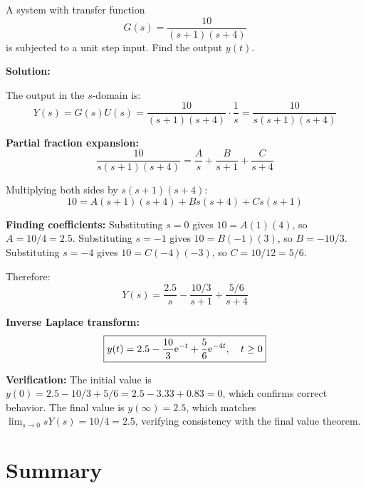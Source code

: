 \begin{example}
\label{ex:inverse_laplace}
A system with transfer function
\begin{equation}
G(s) = \frac{10}{(s+1)(s+4)}
\end{equation}
is subjected to a unit step input. Find the output $y(t)$.

\textbf{Solution:}

The output in the $s$-domain is:
\begin{equation}
Y(s) = G(s)U(s) = \frac{10}{(s+1)(s+4)} \cdot \frac{1}{s} = \frac{10}{s(s+1)(s+4)}
\end{equation}

\textbf{Partial fraction expansion:}
\begin{equation}
\frac{10}{s(s+1)(s+4)} = \frac{A}{s} + \frac{B}{s+1} + \frac{C}{s+4}
\end{equation}

Multiplying both sides by $s(s+1)(s+4)$:
\begin{equation}
10 = A(s+1)(s+4) + Bs(s+4) + Cs(s+1)
\end{equation}

\textbf{Finding coefficients:} Substituting $s = 0$ gives $10 = A(1)(4)$, so $A = 10/4 = 2.5$. Substituting $s = -1$ gives $10 = B(-1)(3)$, so $B = -10/3$. Substituting $s = -4$ gives $10 = C(-4)(-3)$, so $C = 10/12 = 5/6$.

Therefore:
\begin{equation}
Y(s) = \frac{2.5}{s} - \frac{10/3}{s+1} + \frac{5/6}{s+4}
\end{equation}

\textbf{Inverse Laplace transform:}
\begin{equation}
\boxed{y(t) = 2.5 - \frac{10}{3}\mathrm{e}^{-t} + \frac{5}{6}\mathrm{e}^{-4t}, \quad t \geq 0}
\end{equation}

\textbf{Verification:} The initial value is $y(0) = 2.5 - 10/3 + 5/6 = 2.5 - 3.33 + 0.83 = 0$, which confirms correct behavior. The final value is $y(\infty) = 2.5$, which matches $\lim_{s\to 0}sY(s) = 10/4 = 2.5$, verifying consistency with the final value theorem.
\end{example}

\section{Summary}
\label{sec:summary}

